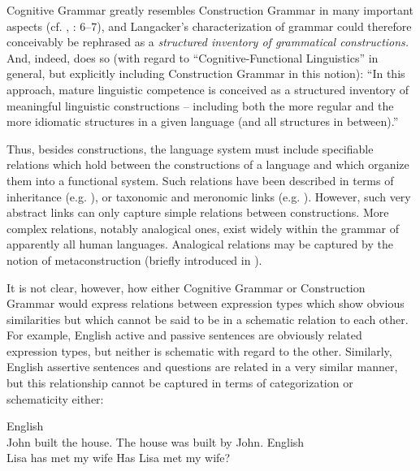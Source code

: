 \documentclass[output=paper, colorlinks,citecolor=brown]{langsci/langscibook}
\begin{document}
Cognitive Grammar greatly resembles Construction Grammar in many important aspects (cf. \citealt{Leino2005a}, \citealt{Croft2001}: 6–7), and Langacker’s characterization of grammar could therefore conceivably be rephrased as a \textit{structured inventory of grammatical constructions.} And, indeed, \citet[258]{Tomasello2006} does so (with regard to “Cognitive-Functional Linguistics” in general, but explicitly including Construction Grammar in this notion): “In this approach, mature linguistic competence is conceived as a structured inventory of meaningful linguistic constructions -- including both the more regular and the more idiomatic structures in a given language (and all structures in between).”

\begin{sloppypar}
Thus, besides constructions, the language system must include specifiable relations which hold between the constructions of a language and which organize them into a functional system. Such relations have been described in terms of inheritance (e.g. \citealt{Goldberg1995}), or taxonomic and meronomic links (e.g. \citealt{Croft2001}). However, such very abstract links can only capture simple relations between constructions. More complex relations, notably analogical ones, exist widely within the grammar of apparently all human languages. Analogical relations may be captured by the notion of metaconstruction (briefly introduced in \citealt{LeinoÖstman2005}).
\end{sloppypar}

It is not clear, however, how either Cognitive Grammar or Construction Grammar would express relations between expression types which show obvious similarities but which cannot be said to be in a schematic relation to each other. For example, English active and passive sentences are obviously related expression types, but neither is schematic with regard to the other. Similarly, English assertive sentences and questions are related in a very similar manner, but this relationship cannot be captured in terms of categorization or schematicity either:

\ea \label{ex:leino_1} 
{English}\\
\ea
     \label{ex:leino_1a}  {John built the house.}
\ex \label{ex:leino_1b} 
      {The house was built by John.}
\z
\ex \label{ex:leino_2} English\\
 \ea
     \label{ex:leino_2a}  {Lisa has met my wife}
    \ex \label{ex:leino_2b} 
      {Has Lisa met my wife?}
\z
\z
\end{document}
